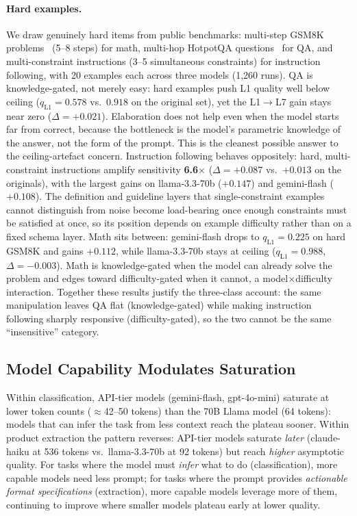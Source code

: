 \paragraph{Hard examples.}
We draw genuinely hard items from public benchmarks: multi-step GSM8K
problems~\citep{cobbe2021gsm8k} (5--8 steps) for math, multi-hop HotpotQA
questions~\citep{yang2018hotpotqa} for QA, and multi-constraint instructions
(3--5 simultaneous constraints) for instruction following, with 20 examples
each across three models (1,260 runs).
QA is knowledge-gated, not merely easy: hard examples push L1 quality well below
ceiling ($q_{\text{L1}} = 0.578$ vs.\ $0.918$ on the original set), yet the
L1$\to$L7 gain stays near zero ($\Delta = +0.021$). Elaboration does not help
even when the model starts far from correct, because the bottleneck is the
model's parametric knowledge of the answer, not the form of the prompt. This is
the cleanest possible answer to the ceiling-artefact concern.
Instruction following behaves oppositely: hard, multi-constraint instructions
amplify sensitivity \textbf{6.6$\times$} ($\Delta = +0.087$ vs.\ $+0.013$ on the
originals), with the largest gains on llama-3.3-70b ($+0.147$) and gemini-flash
($+0.108$). The definition and guideline layers that single-constraint examples
cannot distinguish from noise become load-bearing once enough constraints must
be satisfied at once, so its position depends on example difficulty rather than
on a fixed schema layer.
Math sits between: gemini-flash drops to $q_{\text{L1}} = 0.225$ on hard GSM8K
and gains $+0.112$, while llama-3.3-70b stays at ceiling
($q_{\text{L1}} = 0.988$, $\Delta = -0.003$). Math is knowledge-gated when the
model can already solve the problem and edges toward difficulty-gated when it
cannot, a model$\times$difficulty interaction. Together these results justify
the three-class account: the same manipulation leaves QA flat (knowledge-gated)
while making instruction following sharply responsive (difficulty-gated), so the
two cannot be the same ``insensitive'' category.

\subsection{Model Capability Modulates Saturation}
\label{sec:result-capability}

Within classification, API-tier models (gemini-flash, gpt-4o-mini) saturate at
lower token counts ($\approx$42--50 tokens) than the 70B Llama model (64
tokens): models that can infer the task from less context reach the plateau
sooner. Within product extraction the pattern reverses: API-tier models saturate
\emph{later} (claude-haiku at 536 tokens vs.\ llama-3.3-70b at 92 tokens) but
reach \emph{higher} asymptotic quality. For tasks where the model must
\emph{infer} what to do (classification), more capable models need less prompt;
for tasks where the prompt provides \emph{actionable format specifications}
(extraction), more capable models leverage more of them, continuing to improve
where smaller models plateau early at lower quality.


